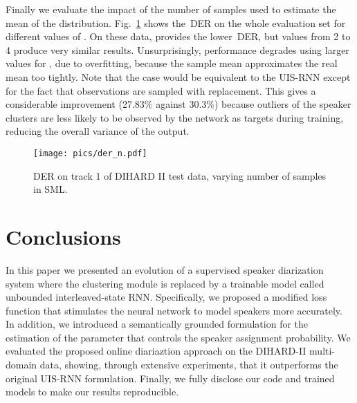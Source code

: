 \documentclass{article}
\begin{document}
Finally we evaluate the impact of the number of samples  used to estimate the mean of the distribution. Fig.~\ref{fig:nsamples} shows the~\ac{DER} on the whole evaluation set for different values of . On these data,  provides the lower~\ac{DER}, but values from 2 to 4 produce very similar results. Unsurprisingly, performance degrades using larger values for , due to overfitting, because the sample mean approximates the real mean too tightly. Note that the case  would be equivalent to the UIS-RNN except for the fact that observations are sampled with replacement. This gives a considerable improvement (27.83\% against 30.3\%) because outliers of the speaker clusters are less likely to be observed by the network as targets during training, reducing the overall variance of the output. \begin{figure}[!ht]
\centering
  \texttt{[image: pics/der\_n.pdf]}
  \caption{\ac{DER} on track 1 of DIHARD II test data, varying number of samples  in SML.}
  \label{fig:nsamples}
\end{figure}
\section{Conclusions}
\label{sec:conclusions}
In this paper we presented an evolution of a supervised speaker diarization system where the clustering module is replaced by a trainable model called unbounded interleaved-state RNN. Specifically, we proposed a modified loss function that stimulates the neural network to model speakers more accurately. In addition, we introduced a semantically grounded formulation for the estimation of the parameter that controls the speaker assignment probability. We evaluated the proposed online diariaztion approach on the DIHARD-II multi-domain data, showing, through extensive experiments, that it outperforms the original UIS-RNN formulation. Finally, we fully disclose our code and trained models to make our results reproducible.

\newpage


\end{document}
